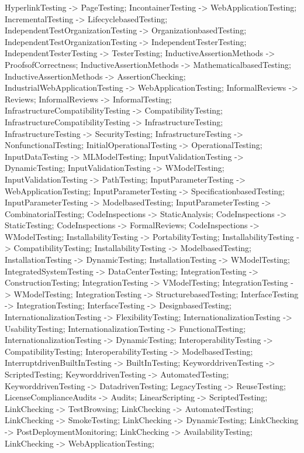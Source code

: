\documentclass{article}
\begin{document}
{HyperlinkTesting -> PageTesting;
IncontainerTesting -> WebApplicationTesting;
IncrementalTesting -> LifecyclebasedTesting;
IndependentTestOrganizationTesting -> OrganizationbasedTesting;
IndependentTestOrganizationTesting -> IndependentTesterTesting;
IndependentTesterTesting -> TesterTesting;
InductiveAssertionMethods -> ProofsofCorrectness;
InductiveAssertionMethods -> MathematicalbasedTesting;
InductiveAssertionMethods -> AssertionChecking;
IndustrialWebApplicationTesting -> WebApplicationTesting;
InformalReviews -> Reviews;
InformalReviews -> InformalTesting;
InfrastructureCompatibilityTesting -> CompatibilityTesting;
InfrastructureCompatibilityTesting -> InfrastructureTesting;
InfrastructureTesting -> SecurityTesting;
InfrastructureTesting -> NonfunctionalTesting;
InitialOperationalTesting -> OperationalTesting;
InputDataTesting -> MLModelTesting;
InputValidationTesting -> DynamicTesting;
InputValidationTesting -> WModelTesting;
InputValidationTesting -> PathTesting;
InputParameterTesting -> WebApplicationTesting;
InputParameterTesting -> SpecificationbasedTesting;
InputParameterTesting -> ModelbasedTesting;
InputParameterTesting -> CombinatorialTesting;
CodeInspections -> StaticAnalysis;
CodeInspections -> StaticTesting;
CodeInspections -> FormalReviews;
CodeInspections -> WModelTesting;
InstallabilityTesting -> PortabilityTesting;
InstallabilityTesting -> CompatibilityTesting;
InstallabilityTesting -> ModelbasedTesting;
InstallationTesting -> DynamicTesting;
InstallationTesting -> WModelTesting;
IntegratedSystemTesting -> DataCenterTesting;
IntegrationTesting -> ConstructionTesting;
IntegrationTesting -> VModelTesting;
IntegrationTesting -> WModelTesting;
IntegrationTesting -> StructurebasedTesting;
InterfaceTesting -> IntegrationTesting;
InterfaceTesting -> DesignbasedTesting;
InternationalizationTesting -> FlexibilityTesting;
InternationalizationTesting -> UsabilityTesting;
InternationalizationTesting -> FunctionalTesting;
InternationalizationTesting -> DynamicTesting;
InteroperabilityTesting -> CompatibilityTesting;
InteroperabilityTesting -> ModelbasedTesting;
InterruptdrivenBuiltInTesting -> BuiltInTesting;
KeyworddrivenTesting -> ScriptedTesting;
KeyworddrivenTesting -> AutomatedTesting;
KeyworddrivenTesting -> DatadrivenTesting;
LegacyTesting -> ReuseTesting;
LicenseComplianceAudits -> Audits;
LinearScripting -> ScriptedTesting;
LinkChecking -> TestBrowsing;
LinkChecking -> AutomatedTesting;
LinkChecking -> SmokeTesting;
LinkChecking -> DynamicTesting;
LinkChecking -> PostDeploymentMonitoring;
LinkChecking -> AvailabilityTesting;
LinkChecking -> WebApplicationTesting;
}
\end{document}
